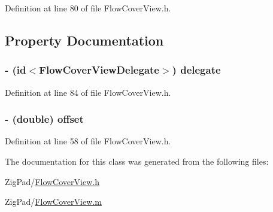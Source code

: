 Definition at line 80 of file FlowCoverView.h.



\subsection{Property Documentation}
\hypertarget{interface_flow_cover_view_a1d8f500666d885b6348c31483be52c4a}{
\subsubsection[{delegate}]{\setlength{\rightskip}{0pt plus 5cm}-\/ (id$<${\bf FlowCoverViewDelegate}$>$) {\bf delegate}}}
\label{interface_flow_cover_view_a1d8f500666d885b6348c31483be52c4a}


Definition at line 84 of file FlowCoverView.h.

\hypertarget{interface_flow_cover_view_a129303e4bd38a8cdba722b6238ed56e9}{
\subsubsection[{offset}]{\setlength{\rightskip}{0pt plus 5cm}-\/ (double) offset}}
\label{interface_flow_cover_view_a129303e4bd38a8cdba722b6238ed56e9}


Definition at line 58 of file FlowCoverView.h.



The documentation for this class was generated from the following files:\begin{DoxyCompactItemize}
\item 
ZigPad/\hyperlink{_flow_cover_view_8h}{FlowCoverView.h}\item 
ZigPad/\hyperlink{_flow_cover_view_8m}{FlowCoverView.m}\end{DoxyCompactItemize}
